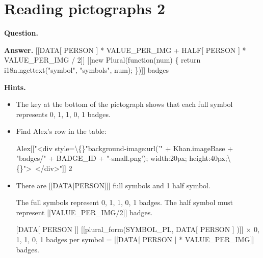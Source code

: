 \documentclass{article}
\begin{document}
\section*{Reading pictographs 2}
\textbf{Question.} 

\textbf{Answer.} [[DATA[ PERSON ] * VALUE\_PER\_IMG + HALF[ PERSON ] * VALUE\_PER\_IMG / 2]] [[new Plural(function(num) \{
            return i18n.ngettext("symbol", "symbols", num);
        \})]] badges

\textbf{Hints.}
\begin{itemize}
  \item The key at the bottom of the pictograph shows that each full symbol represents 0, 1, 1, 0, 1 badges.
  \item Find Alex's row in the table:
                    
                        Alex[["<div style=\textbackslash\{\}"background-image:url('" + Khan.imageBase + "badges/" + BADGE\_ID + "-small.png'); width:20px; height:40px;\textbackslash\{\}"> </div>"]]
                        2
  \item There are [[DATA[PERSON]]] full symbols and 1 half symbol.
                    
                        The full symbols represent 0, 1, 1, 0, 1 badges.
                        The half symbol must represent [[VALUE\_PER\_IMG/2]] badges.
  \item [[DATA[ PERSON ]]] [[plural\_form(SYMBOL\_PL, DATA[ PERSON ] )]]
                         $\times$ 
                        0, 1, 1, 0, 1 badges per symbol
                         = [[DATA[ PERSON ] * VALUE\_PER\_IMG]] badges.
                        

\end{itemize}
\end{document}
